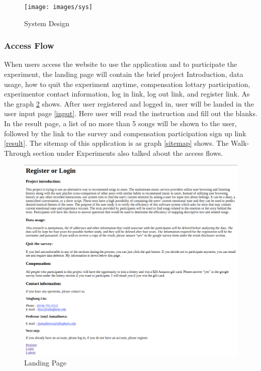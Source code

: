 \begin{figure}[htbp]
\centering
\texttt{[image: images/sys]}
\caption{System Design}
\label{sys}
\end{figure}

\subsubsection{Access Flow}

When users access the website to use the application and to participate the experiment,
the landing page will contain the brief project Introduction, data usage, how to
quit the experiment anytime, compensation lottary participation, experimentor contact
information, log in link, log out link, and register link. As the graph \ref{landing} shows.
After user registered and logged in, user will be landed in the user input page \ref{input}.
Here user will read the instruction and fill out the blanks. In the result page,
a list of no more than 5 songs will be shown to the user, followed by the link to
the survey and compensation participation sign up link \ref{result}. The sitemap
of this application is as graph \ref{sitemap} shows. The Walk-Through section under
Experiments also talked about the access flows.

\begin{figure}[htbp]
\centering
\includegraphics[width=6 in]{images/landing}
\caption{Landing Page}
\label{landing}
\end{figure}

